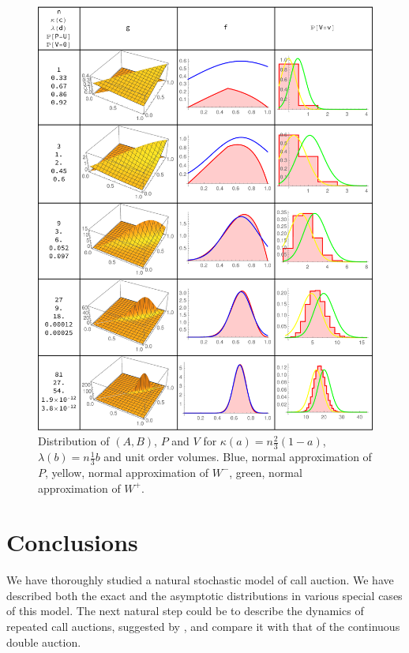 \documentclass{aptpub}
\begin{document}
\begin{figure}
\begin{center}
\includegraphics[width=\textwidth]{illust.pdf}
\caption{Distribution of $(A,B)$, $P$ and $V$ for $\kappa(a)=n \frac{2}{3}(1-a)$, $\lambda(b)=n \frac{1}3 b$ and unit order volumes. Blue, normal approximation of $P$, yellow, normal approximation of $W^-$, green, normal approximation of $W^+$. }
\label{fig:il}
\end{center}
\end{figure}

\section{Conclusions}

We have thoroughly studied a natural stochastic model of call auction. We have described both the exact and the asymptotic distributions in various special cases of this model. The next natural step could be to describe the dynamics of repeated call auctions, suggested by \cite{budish2015high}, and compare it with that of the continuous double auction.
\end{document}
